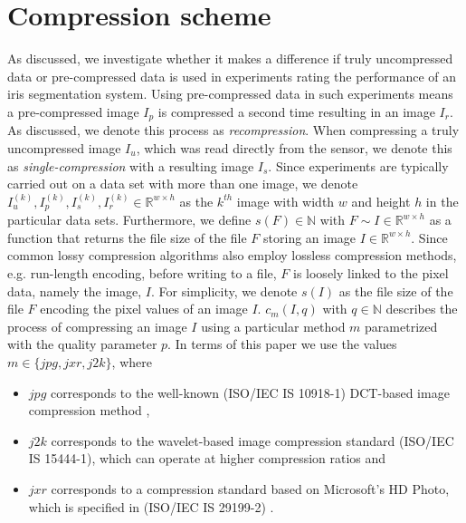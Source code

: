 \documentclass[10pt,twocolumn,letterpaper]{article}
\begin{document}
\section{Compression scheme}
\label{section:comprScheme}
As discussed, we investigate whether it makes a difference if truly uncompressed data or pre-compressed data is used in experiments rating the performance of an iris segmentation system. 
Using pre-compressed data in such experiments means a pre-compressed image $I_p$ is compressed a second time resulting in an image $I_r$. As discussed, we denote this process as \emph{recompression}. When compressing a truly uncompressed image $I_u$, which was read directly from the sensor, we denote this as \emph{single-compression} with a resulting image $I_s$. Since experiments are typically carried out on a data set with more than one image, we denote $I_u^{(k)}, I_p^{(k)}, I_s^{(k)}, I_r^{(k)} \in \mathbb{R}^{w \times h}$ as the $k^{th}$ image with width $w$ and height $h$ in the particular data sets. Furthermore, we define $s(F) \in \mathbb{N}$ with $F \sim{I \in \mathbb{R}^{w \times h}}$ as a function that returns the file size of the file $F$ storing an image $I \in \mathbb{R}^{w \times h} $. Since common lossy compression algorithms also employ lossless compression methods, e.g. run-length encoding, before writing to a file, $F$ is loosely linked to the pixel data, namely the image, $I$. For simplicity, we denote $s(I)$ as the file size of the file $F$ encoding the pixel values of an image $I$. $c_{m}(I, q)$ with $q \in \mathbb{N}$ describes the process of compressing an image $I$ using a particular method $m$ parametrized with the quality parameter $p$. In terms of this paper we use the values $m \in \{jpg, jxr, j2k\}$, where 
\begin{itemize}
	\item $jpg$ corresponds to the well-known (ISO/IEC IS 10918-1) DCT-based image compression method \cite{jpg},
	\item $j2k$ corresponds to the wavelet-based image compression standard (ISO/IEC IS 15444-1), which can operate at higher compression ratios \cite{j2k} and
	\item $jxr$ corresponds to a compression standard based on Microsoft’s HD Photo, which is specified in (ISO/IEC IS 29199-2) \cite{jxr}.  
\end{itemize}

\end{document}
